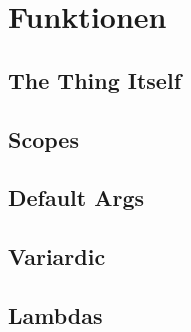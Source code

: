 \chapter{Funktionen}
\label{chp:Funcs}
\section{The Thing Itself}
\section{Scopes}
\section{Default Args}
\section{Variardic}
\section{Lambdas}
